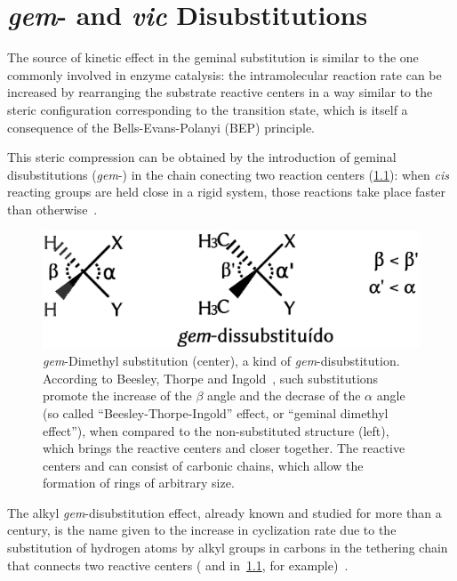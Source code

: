 \chapter{\emph{gem}- and \emph{vic} Disubstitutions}%
\label{ch:gem-vic-disubstitions}

The source of kinetic effect in the geminal substitution is similar to the one
commonly involved in enzyme catalysis:
the intramolecular reaction rate can be
increased by rearranging the substrate reactive centers in a way similar to the
steric configuration corresponding to the transition state, which is itself a
consequence of the Bells-Evans-Polanyi (BEP) principle.

This steric compression can be obtained by the introduction of geminal
disubstitutions (\emph{gem}-) in the chain conecting two reaction centers
(\cref{fig:gem-dimetila}):
when \emph{cis} reacting groups are held close in a rigid system,
those reactions take place faster than
otherwise~\cite{Beesley_1915,Allinger_1960,Bruice_1960a,Bruice_1960b,Capon_1964,Bruice_1965,Kirby_1972,Galli_1979,Kirby_1980,Lightstone_1994,Kaneti_2004,Jung_2005,Karaman_2011}.
%
\begin{figure}[hbtp]
	\centering
	\includegraphics[width=.55\textwidth]{figures/gem-dimetil-pt}
	\caption[Beesley-Thorpe-Ingold effect, also known as geminal dimethyl
		effect.]{
		\emph{gem}-Dimethyl substitution (center), a kind of
		\emph{gem}-disubstitution.
		According to Beesley, Thorpe and Ingold~\cite{Beesley_1915,Jung_2005},
		such substitutions promote the increase of the $\beta$ angle and the
		decrase of the $\alpha$ angle (so called ``Beesley-Thorpe-Ingold''
		effect, or ``geminal dimethyl effect''),
		when compared to the non-substituted structure (left),
		which brings the reactive centers
		 and 
		closer together.
		The reactive centers  and  can consist of
		carbonic chains,
		which allow the formation of rings of arbitrary size.}\label{fig:gem-dimetila}
\end{figure}
%
The alkyl \emph{gem}-disubstitution effect,
already known and studied for more than a century,
is the name given to the increase in cyclization rate due
to the substitution of hydrogen atoms by alkyl groups in carbons in the
tethering chain that connects two reactive centers ( and 
in~\cref{fig:gem-dimetila}, for example)~\cite{Capon_1964,Kirby_1980,Kaneti_2004,Jung_2005}.

